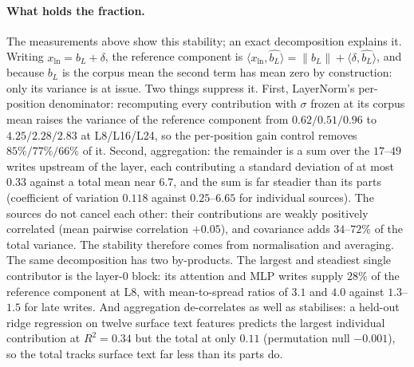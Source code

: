 \documentclass[11pt]{article}
\newcommand{\bl}{b_L}
\begin{document}
\paragraph{What holds the fraction.} The measurements above show this
stability; an exact decomposition explains it. Writing $x_{\text{ln}} = \bl + \delta$, the
reference component is
$\langle x_{\text{ln}}, \hat{\bl}\rangle = \|\bl\| +
\langle \delta, \hat{\bl}\rangle$, and because $\bl$ is the
corpus mean the second term has mean zero by construction: only its
variance is at issue. Two things suppress it. First, LayerNorm's
per-position denominator: recomputing every contribution with $\sigma$
frozen at its corpus mean raises the variance of the reference
component from $0.62 / 0.51 / 0.96$ to $4.25 / 2.28 / 2.83$ at
L8/L16/L24, so the per-position gain control removes $85\% / 77\% /
66\%$ of it. Second, aggregation: the remainder is a sum over the
$17$--$49$ writes upstream of the layer, each contributing a standard
deviation of at most $0.33$ against a total mean near $6.7$, and the
sum is far steadier than its parts (coefficient of variation $0.118$
against $0.25$--$6.65$ for individual sources). The sources do
not cancel each other: their contributions are weakly positively
correlated (mean pairwise correlation $+0.05$), and covariance adds
$34$--$72\%$ of the total variance. The stability therefore comes from
normalisation and averaging. The same decomposition has two by-products.
The largest and steadiest single contributor is the layer-0 block: its
attention and MLP writes supply $28\%$ of the reference component at L8,
with mean-to-spread ratios of $3.1$ and $4.0$ against $1.3$--$1.5$ for
late writes. And aggregation de-correlates as well as stabilises: a
held-out ridge regression on twelve surface text features predicts the
largest individual contribution at $R^2 = 0.34$ but the total at only
$0.11$ (permutation null $-0.001$), so the total tracks surface text far
less than its parts do.
\end{document}
